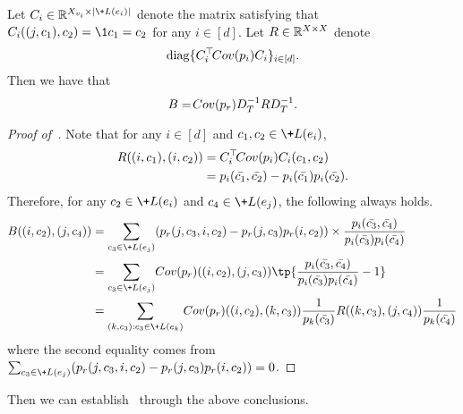 \begin{proposition}\label{prop:convert_B_to_Cov}
    Let $C_i\in \mathbb{R}^{X_{v_i}\times |\+L(e_i)|}$ denote the matrix satisfying that $C_i((j,c_1),c_2) = \1{c_1 = c_2}$ for any $i\in [d]$.
    Let $\*R \in \mathbb{R}^{X\times X}$ denote $$
    \operatorname{diag}\{C^\top_i \!{Cov}(\*p_i)C_i\}_{i\in [d]}.
    $$
    Then we have that
    $$
        \*B =  \!{Cov}(\*p_r)D_T^{-1}\*RD_T^{-1}.
    $$
\end{proposition}
\begin{proof}[Proof of~]
Note that for any $i\in [d]$ and $c_1,c_2\in \+L(e_i)$,
    \begin{align*}
        \*R((i,c_1),(i,c_2)) &= C_i^\top  \!{Cov}(\*p_i)C_i(c_1,c_2)
        \\&= \*p_i(\bar{c_1},\bar{c_2})-\*p_i(\bar{c_1})\*p_i(\bar{c_2}).
    \end{align*}
    Therefore, for any $c_2\in \+L(e_i)$ and $c_4\in \+L(e_j)$, the following always holds.
    \begin{align*}
        \*B((i,c_2),(j,c_4)) &= 
        \sum_{c_3 \in \+L(e_j)}
        (\*p_r(j,c_3,i,c_2) - \*p_r(j,c_3)\*p_r(i,c_2))
        \times \frac{\*p_i(\bar{c_3},\bar{c_4})}{\*p_i(\bar{c_3})\*p_i(\bar{c_4})}
        \\&= \sum_{c_3\in \+L(e_j)}  \!{Cov}(\*p_r)((i,c_2),(j,c_3)) \tp{\frac{\*p_i(\bar{c_3},\bar{c_4})}{\*p_i(\bar{c_3})\*p_i(\bar{c_4})} - 1}
        \\&= \sum_{(k,c_3): c_3\in \+L(e_k)}  \!{Cov}(\*p_r)((i,c_2),(k,c_3))
        \frac{1}{\*p_k(\bar{c_3})}
        \*R((k,c_3),(j,c_4))
        \frac{1}{\*p_k(\bar{c_4})}
    \end{align*}
    where the second equality comes from $\sum_{c_3 \in \+L(e_j)}
        (\*p_r(j,c_3,i,c_2) - \*p_r(j,c_3)\*p_r(i,c_2))=0$.
\end{proof}
Then we can establish~ through the above conclusions.
